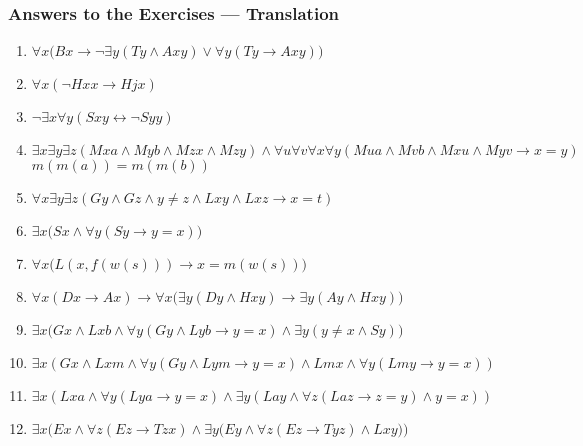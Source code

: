 \documentclass[UTF8,aspectratio=43,11pt,colorlinks,compress,openany]{beamer}%
\begin{document}
\begin{frame}\frametitle{Answers to the Exercises --- Translation}
\begin{enumerate}
	\item $\forall x\big(Bx\to \neg\exists y(Ty\wedge Axy)\vee \forall y(Ty\to Axy)\big)$
	\item $\forall x(\neg Hxx\to Hjx)$
	\item $\neg\exists x\forall y(Sxy\leftrightarrow\neg Syy)$
	\item $\exists x\exists y\exists z(Mxa\wedge Myb\wedge Mzx\wedge Mzy)\wedge\forall u\forall v\forall x\forall y(Mua\wedge Mvb\wedge Mxu\wedge Myv\to x=y)$\hfill $m(m(a))=m(m(b))$
	\item $\forall x\exists y\exists z(Gy\wedge Gz\wedge y\ne z\wedge Lxy\wedge Lxz\to x=t)$
	\item $\exists x\big(Sx\wedge\forall y(Sy\to y=x)\big)$
	\item $\forall x\big(L(x,f(w(s)))\to x=m(w(s))\big)$
	\item $\forall x(Dx\to Ax)\to\forall x\big(\exists y(Dy\wedge Hxy)\to\exists y(Ay\wedge Hxy)\big)$
	\item $\exists x\big(Gx\wedge Lxb\wedge\forall y(Gy\wedge Lyb\to y=x)\wedge\exists y(y\ne x\wedge Sy)\big)$
	\item $\exists x(Gx\wedge Lxm\wedge\forall y(Gy\wedge Lym\to y=x)\wedge Lmx\wedge \forall y(Lmy\to y=x))$
	\item $\exists x(Lxa\wedge\forall y(Lya\to y=x)\wedge\exists y(Lay\wedge\forall z(Laz\to z=y)\wedge y=x))$
	\item $\exists x\Big(Ex\wedge \forall z(Ez\to Tzx)\wedge \exists y\big(Ey\wedge\forall z(Ez\to Tyz)\wedge Lxy\big)\Big)$
\end{enumerate}
\end{frame}
\end{document}

